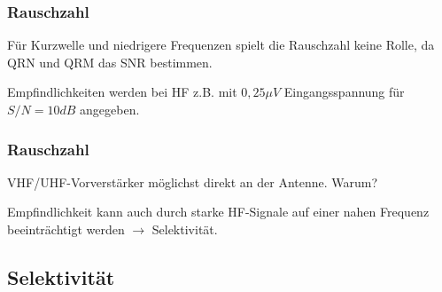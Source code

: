 \begin{frame}
  \frametitle{Rauschzahl}

  Für Kurzwelle und niedrigere Frequenzen spielt die Rauschzahl keine Rolle,
  da QRN und QRM das SNR bestimmen.

  \bigskip

  Empfindlichkeiten werden bei HF z.B. mit $0,25 \mu V$ Eingangsspannung für
  $S/N=10 dB$ angegeben.

\end{frame}

\begin{frame}
  \frametitle{Rauschzahl}

  VHF/UHF-Vorverstärker möglichst direkt an der Antenne. Warum?\\

  \bigskip

  Empfindlichkeit kann auch durch starke HF-Signale auf einer nahen Frequenz
  beeinträchtigt werden $\rightarrow$ Selektivität.

\end{frame}

\subsection{Selektivität}

